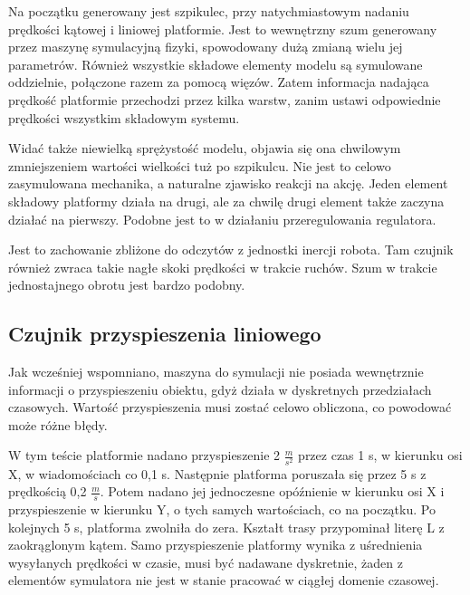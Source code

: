 		Na początku generowany jest szpikulec, przy natychmiastowym nadaniu prędkości kątowej i liniowej platformie.
		Jest to wewnętrzny szum generowany przez maszynę symulacyjną fizyki, spowodowany dużą zmianą wielu jej parametrów.
		Również wszystkie składowe elementy modelu są symulowane oddzielnie, połączone razem za pomocą więzów.
		Zatem informacja nadająca prędkość platformie przechodzi przez kilka warstw, zanim ustawi odpowiednie prędkości wszystkim składowym systemu.
		
		Widać także niewielką sprężystość modelu, objawia się ona chwilowym zmniejszeniem wartości wielkości tuż po szpikulcu.
		Nie jest to celowo zasymulowana mechanika, a naturalne zjawisko reakcji na akcję. Jeden element składowy platformy działa na drugi, ale za chwilę drugi element także
		zaczyna działać na pierwszy. Podobne jest to w działaniu przeregulowania regulatora.
		
		Jest to zachowanie zbliżone do odczytów z jednostki inercji robota. Tam czujnik również zwraca takie nagłe skoki prędkości w trakcie ruchów.
		Szum w trakcie jednostajnego obrotu jest bardzo podobny.
		
	\subsection{Czujnik przyspieszenia liniowego}
		Jak wcześniej wspomniano, maszyna do symulacji nie posiada wewnętrznie informacji o przyspieszeniu obiektu, gdyż działa w dyskretnych przedziałach czasowych.
		Wartość przyspieszenia musi zostać celowo obliczona, co powodować może różne błędy.
		
		W tym teście platformie nadano przyspieszenie 2 $\frac{m}{s^2}$ przez czas 1 s, w kierunku osi X, w wiadomościach co 0,1 s.
		Następnie platforma poruszała się przez 5 s z prędkością 0,2 $\frac{m}{s}$.
		Potem nadano jej jednoczesne opóźnienie w kierunku osi X i przyspieszenie w kierunku Y, o tych samych wartościach, co na początku.
		Po kolejnych 5 s, platforma zwolniła do zera. Kształt trasy przypominał literę L z zaokrąglonym kątem.
		Samo przyspieszenie platformy wynika z uśrednienia wysyłanych prędkości w czasie, musi być nadawane dyskretnie, żaden z elementów symulatora nie jest w stanie
		pracować w ciągłej domenie czasowej.
		
